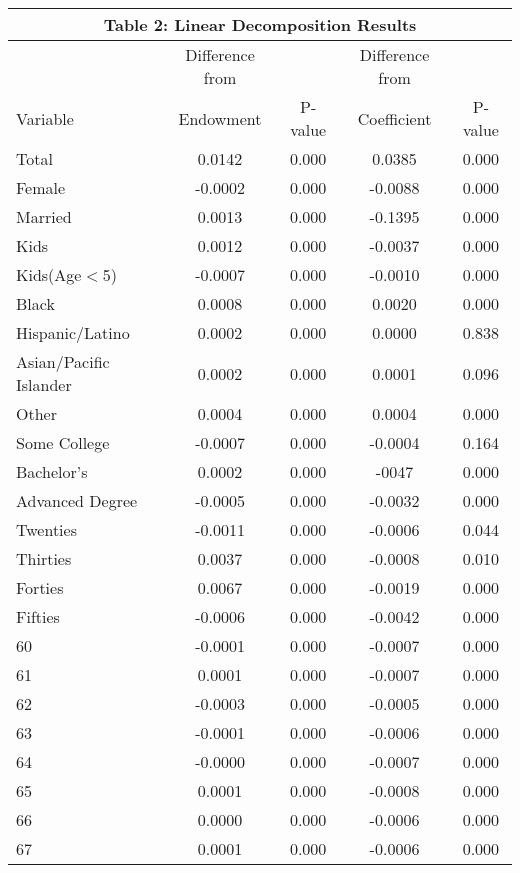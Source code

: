 \documentclass[11pt]{article}
\theoremstyle{definition}
\begin{document}
\vspace{2.5mm}
\noindent
\begin{center}
\begin{tabular}{l c c c c}
\hline\hline
\multicolumn{5}{c}{\textbf{Table 2: Linear Decomposition Results}} \\
\hline
 & Difference from  &  &  Difference from &  \\
Variable & Endowment & P-value &  Coefficient & P-value \\
\hline
Total & 0.0142 & 0.000 & 0.0385 & 0.000 \\
 Female & -0.0002 & 0.000 & -0.0088 & 0.000 \\
 Married & 0.0013 & 0.000 & -0.1395 & 0.000 \\
 Kids  & 0.0012 & 0.000 & -0.0037 & 0.000 \\
 Kids(Age$<$5)  & -0.0007 & 0.000 & -0.0010 & 0.000 \\
 Black & 0.0008 & 0.000 & 0.0020 & 0.000 \\
 Hispanic/Latino  & 0.0002 & 0.000 & 0.0000 & 0.838 \\
 Asian/Pacific Islander  & 0.0002 & 0.000 & 0.0001 & 0.096 \\
 Other & 0.0004 & 0.000 & 0.0004 & 0.000 \\
 Some College  & -0.0007 & 0.000 & -0.0004 & 0.164 \\
 Bachelor's  & 0.0002 & 0.000 & -0047 & 0.000 \\
 Advanced Degree  & -0.0005 & 0.000 & -0.0032 & 0.000 \\
 Twenties  & -0.0011 & 0.000 & -0.0006 & 0.044 \\
 Thirties  & 0.0037 & 0.000 & -0.0008 & 0.010 \\
 Forties  & 0.0067 & 0.000 & -0.0019 & 0.000 \\
 Fifties  & -0.0006 & 0.000 & -0.0042 & 0.000 \\
 60  & -0.0001 & 0.000 & -0.0007 & 0.000 \\
 61  & 0.0001 & 0.000 & -0.0007 & 0.000 \\
 62 & -0.0003 & 0.000 & -0.0005 & 0.000 \\
 63  & -0.0001 & 0.000 & -0.0006 & 0.000 \\
 64  & -0.0000 & 0.000 & -0.0007 & 0.000 \\
 65 & 0.0001 & 0.000 & -0.0008 & 0.000 \\
 66  & 0.0000 & 0.000 & -0.0006 & 0.000 \\
 67  & 0.0001 & 0.000 & -0.0006 & 0.000 \\

\end{tabular}
\end{center}
\end{document}
